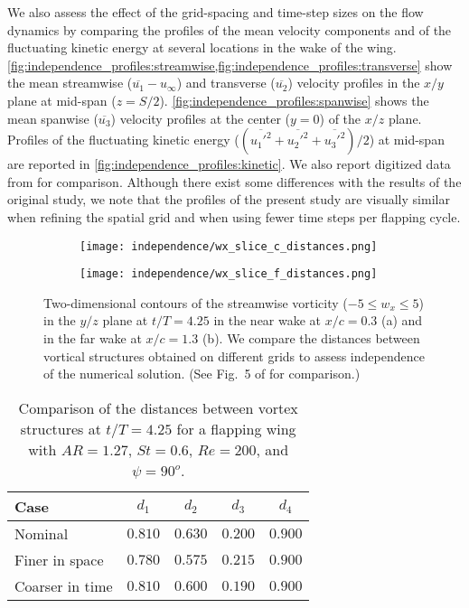 We also assess the effect of the grid-spacing and time-step sizes on the flow dynamics by comparing the profiles of the mean velocity components and of the fluctuating kinetic energy at several locations in the wake of the wing.
\cref{fig:independence_profiles:streamwise,fig:independence_profiles:transverse} show the mean streamwise ($\overline{u_1} - u_\infty$) and transverse ($\overline{u_2}$) velocity profiles in the $x/y$ plane at mid-span ($z = S / 2$).
\cref{fig:independence_profiles:spanwise} shows the mean spanwise ($\overline{u_3}$) velocity profiles at the center ($y = 0$) of the $x/z$ plane.
Profiles of the fluctuating kinetic energy ($( \overline{{u_1'}^2} + \overline{{u_2'}^2} + \overline{{u_3'}^2} ) / 2$) at mid-span are reported in \cref{fig:independence_profiles:kinetic}.
We also report digitized data from \citet{li_dong_2016} for comparison.
Although there exist some differences with the results of the original study, we note that the profiles of the present study are visually similar when refining the spatial grid and when using fewer time steps per flapping cycle.

\begin{figure}[!h]
  \centering
  \begin{subfigure}[c]{0.35\textwidth}
    \centering
    \texttt{[image: independence/wx\_slice\_c\_distances.png]}
    \caption{}
  \end{subfigure}
  \hspace{1em}
  \begin{subfigure}[c]{0.35\textwidth}
    \centering
    \texttt{[image: independence/wx\_slice\_f\_distances.png]}
    \caption{}
  \end{subfigure}
  \caption{Two-dimensional contours of the streamwise vorticity ($-5 \leq w_x \leq 5$) in the $y/z$ plane at $t/T = 4.25$ in the near wake at $x / c = 0.3$ (a) and in the far wake at $x / c = 1.3$ (b). We compare the distances between vortical structures obtained on different grids to assess independence of the numerical solution. (See Fig.~5 of \citet{li_dong_2016} for comparison.)}
  \label{fig:independence_wx_distances}
\end{figure}

\begin{table}[!h]
  \centering
  \begin{tabular}{lcccc}
    \hline\hline
    Case & $d_1$ & $d_2$ & $d_3$ & $d_4$ \\
    \hline
    Nominal & $0.810$ & $0.630$ & $0.200$ & $0.900$ \\
    Finer in space & $0.780$ & $0.575$ & $0.215$ & $0.900$ \\
    Coarser in time & $0.810$ & $0.600$ & $0.190$ & $0.900$ \\
    \hline\hline
  \end{tabular}
  \caption{Comparison of the distances between vortex structures at $t / T = 4.25$ for a flapping wing with $AR = 1.27$, $St = 0.6$, $Re = 200$, and $\psi = 90^o$.}
  \label{tab:independence_wx_distances}
\end{table}

